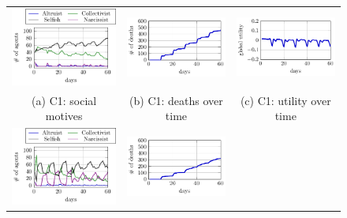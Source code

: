 \begin{figure}[htb]
    \centering
    \begin{tabular}{ccc}
    \includegraphics[width=0.3\linewidth]{008_team_6_agent_design/C/C2_SM.pdf} &   \includegraphics[width=0.3\linewidth]{008_team_6_agent_design/C/C2_deaths.pdf} &
    \includegraphics[width=0.3\linewidth]{008_team_6_agent_design/C/C2_utility.pdf}\\[0pt]
    (a) C1: social motives & (b) C1: deaths over time & (c) C1: utility over time \\[8pt]
    \includegraphics[width=0.3\linewidth]{008_team_6_agent_design/C/C4_SM.pdf} &   \includegraphics[width=0.3\linewidth]{008_team_6_agent_design/C/C4_deaths.pdf} &

\end{tabular}
\end{figure}
